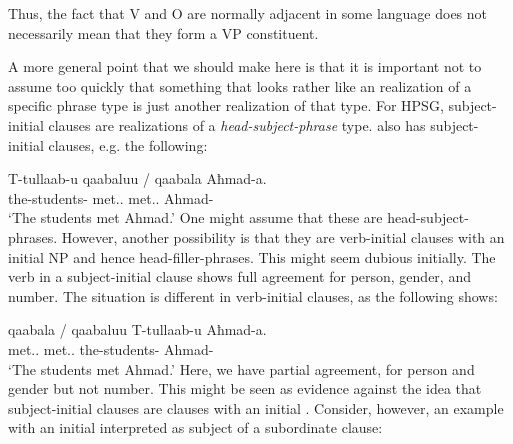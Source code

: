 \documentclass[output=paper]{langsci/langscibook}
\begin{document}
\ea\label{ex:key:4.25}
\z
%
Thus, the fact that V and O are normally adjacent in some language does not
necessarily mean that they form a VP constituent.

A more general point that we should make here is that it is important not to
assume too quickly that something that looks rather like an 
realization of a specific phrase type is just another realization of that type.
For \gls{HPSG},  subject-initial clauses are realizations of a
\emph{head-subject-phrase} type.  also has subject-initial clauses,
e.g. the following:

\ea\label{ex:key:4.26}
    \sn\gll T-tullaab-u qaabaluu {/ } \llap{*}qaabala Aħmad-a.\\
            the-students-\Nom{} met.\Tpl.\M{} {} met.\Tsg.\M{} Ahmad-\Acc{}\\
    \glt    \enquote*{The students met Ahmad.}
\z
%
One might assume that these are head-subject-phrases. However, another
possibility is that they are verb-initial clauses with an initial NP  and
hence head-filler-phrases. This might seem dubious initially. The verb in a
subject-initial clause shows full agreement for person, gender, and
number. The
situation is different in verb-initial clauses, as the following shows:

\ea\label{ex:key:4.27}
    \sn\gll qaabala {/ } \llap{*}qaabaluu T-tullaab-u Aħmad-a.\\
            met.\Tsg.\M{} {} met.\Tpl.\M{} the-students-\Nom{} Ahmad-\Acc{}\\
    \glt    \enquote*{The students met Ahmad.}
\z
%
Here, we have partial agreement,  for person and gender but not
number. This might be seen as evidence against the idea that subject-initial
clauses are clauses with an initial . Consider, however, an example with
an initial  interpreted as subject of a subordinate clause:
\end{document}
